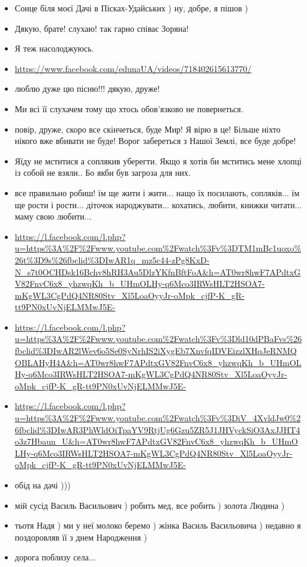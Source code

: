 \begin{itemize}
\item Сонце біля моєї Дачі в Пісках-Удайських ) ну, добре, я пішов )
\item Дякую, брате! слухаю! так гарно співає Зоряна!
\item Я теж насолоджуюсь.
\item \url{https://www.facebook.com/edunaUA/videos/718402615613770/}
\item люблю дуже цю пісню!!! дякую, друже!
\item Ми всі її слухачем тому що хтось обов'язково не повернеться.
\item повір, друже, скоро все скінчеться, буде Мир! Я вірю в це! Більше ніхто
нікого вже вбивати не буде!  Ворог забереться з Нашої Землі, все буде
добре!
\item Яїду не мститися а соплякив уберегти.
Якщо я хотів би мститись мене хлопці із собой не взяли..
Бо якби був загроза для них.
\item все правильно робиш! їм ще жити і жити... нащо їх посилають, сопляків... їм ще рости і рости... діточок народжувати... кохатись, любити, книжки читати... маму свою любити...
\item \url{https://l.facebook.com/l.php?u=https%3A%2F%2Fwww.youtube.com%2Fwatch%3Fv%3DTM1mBc1uoxo%26t%3D9s%26fbclid%3DIwAR1q_mz5c44-zPg8KxD-N_s7t0OCHDsk16Bchv8hRH3Au5DlzYKfnBftFoA&h=AT0wr8hwF7APdtxGV82FnvC6x8_yhzwqKh_b_UHmOLHy-q6Mco3IRWsHLT2HSOA7-mKgWL3CgPdQ4NR80Stv_Xl5LoaOyyJr-oMpk_cjfP-K_gR-tt9PN0xUvNjELMMwJ5E-}
\item \url{https://l.facebook.com/l.php?u=https%3A%2F%2Fwww.youtube.com%2Fwatch%3Fv%3Dld10dPBaFvs%26fbclid%3DIwAR2lWev6o5Se0SyNrhIS2iXygEb7XnvfqIDVEizzlXHqJeRNMQOBLAHyH4A&h=AT0wr8hwF7APdtxGV82FnvC6x8_yhzwqKh_b_UHmOLHy-q6Mco3IRWsHLT2HSOA7-mKgWL3CgPdQ4NR80Stv_Xl5LoaOyyJr-oMpk_cjfP-K_gR-tt9PN0xUvNjELMMwJ5E-}
\item \url{https://l.facebook.com/l.php?u=https%3A%2F%2Fwww.youtube.com%2Fwatch%3Fv%3DiV_4XvldJw0%26fbclid%3DIwAR3PhWldOiTpaYV9RtjUg6Gzu5ZR5J1JHVyckSiO3AxJJHT4o3z7Hbaun_U&h=AT0wr8hwF7APdtxGV82FnvC6x8_yhzwqKh_b_UHmOLHy-q6Mco3IRWsHLT2HSOA7-mKgWL3CgPdQ4NR80Stv_Xl5LoaOyyJr-oMpk_cjfP-K_gR-tt9PN0xUvNjELMMwJ5E-}
\item обід на дачі )))
\item мій сусід Василь Васильович ) робить мед, все робить ) золота Людина )
\item тьотя Надя ) ми у неї молоко беремо ) жінка Василь Васильовича ) недавно
я поздоровляв її з днем Народження )
\item дорога поблизу села...

\end{itemize}
